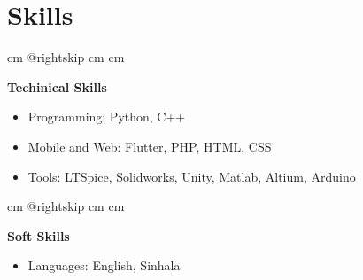 \documentclass[10pt, a4paper]{article}
\newenvironment{highlights}{
        \begin{itemize}[
                topsep=0pt,
                parsep=0.10 cm,
                partopsep=0pt,
                itemsep=0pt,
                after=\vspace{-1\baselineskip},
                leftmargin=0.4 cm + 3pt
            ]
    }{
        \end{itemize}
    } %
\let\hrefWithoutArrow\href
\renewcommand{\href}[2]{\hrefWithoutArrow{#1}{\mbox{\ifthenelse{\equal{#2}{}}{ }{#2 }\raisebox{.15ex}{\footnotesize \faExternalLink*}}}}
\let\originalTabularx\tabularx
\let\originalEndTabularx\endtabularx
\renewenvironment{tabularx}{\bgroup\centering\originalTabularx}{\originalEndTabularx\par\egroup}
\begin{document}
%
%
%
%
%

\vspace{0.2 cm}
 \section{Skills}

        \begingroup{} cm
        \advance\csname @rightskip cm
        \advance{} cm

        \textbf{Techinical Skills} 
        \begin{highlights}
        \item Programming: Python, C++
        \item Mobile and Web: Flutter, PHP, HTML, CSS%
        \item Tools: LTSpice, Solidworks, Unity, Matlab, Altium, Arduino  %
        \end{highlights}
        \par\endgroup

        \vspace{0.6 cm}
        \begingroup{} cm
        \advance\csname @rightskip cm
        \advance{} cm

        \textbf{Soft Skills}  \begin{highlights}
        \item Languages: English, Sinhala \end{highlights}
        \par\endgroup
    
    \vspace{0.4 cm}
    
\end{document}
